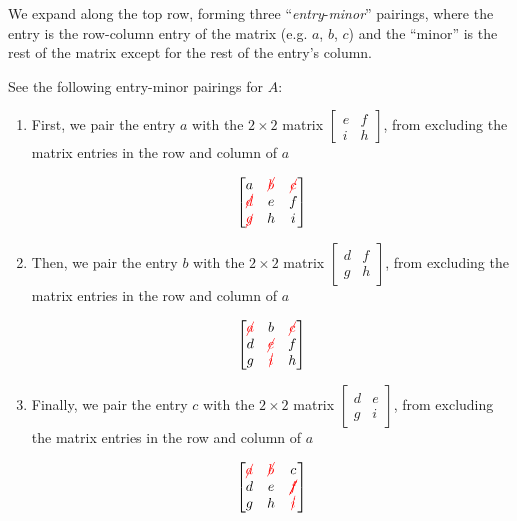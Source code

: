 \documentclass{ximera}
\begin{document}
We expand along the top row, forming three ``\emph{entry}-\emph{minor}'' pairings, where the entry is the row-column entry of the matrix (e.g. $a$, $b$, $c$) and the ``minor'' is the rest of the matrix except for the rest of the entry's column. 

See the following entry-minor pairings for $A$:

\begin{enumerate}
    \item First, we pair the entry $a$ with the $2\times 2$ matrix $\begin{bmatrix}
        e&f\\i&h
    \end{bmatrix}$, from excluding the matrix entries in the row and column of $a$

    $$
    \begin{bmatrix}
    a & \textcolor{red}{\cancel{b}} & \textcolor{red}{\cancel{c}} \\
    \textcolor{red}{\cancel{d}} & e & f \\
    \textcolor{red}{\cancel{g}} & h & i
    \end{bmatrix}
    $$

    \item Then, we pair the entry $b$ with the $2\times 2$ matrix $\begin{bmatrix}
        d&f\\g&h
    \end{bmatrix}$, from excluding the matrix entries in the row and column of $a$

    $$
    \begin{bmatrix}
    \textcolor{red}{\cancel{a}} & b & \textcolor{red}{\cancel{c}} \\
    d & \textcolor{red}{\cancel{e}} & f \\
    g & \textcolor{red}{\cancel{i}} & h
    \end{bmatrix}
    $$

    \item Finally, we pair the entry $c$ with the $2\times 2$ matrix $\begin{bmatrix}
        d&e\\g&i
    \end{bmatrix}$, from excluding the matrix entries in the row and column of $a$

    $$
    \begin{bmatrix}
    \textcolor{red}{\cancel{a}} & \textcolor{red}{\cancel{b}} & c \\
    d & e & \textcolor{red}{\cancel{f}} \\
    g & h & \textcolor{red}{\cancel{i}}
    \end{bmatrix}
    $$

\end{enumerate}
\end{document}
